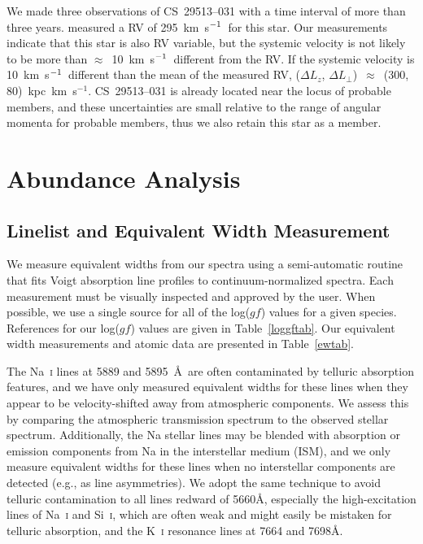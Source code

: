 \documentclass{emulateapj}
\def\kmsec{\mbox{km~s$^{\rm -1}$}}
\begin{document}
We made three observations of \mbox{CS~29513--031} 
with a time interval of more than three years.
\citet{beers92} measured a RV of 295~\kmsec\ for this star.
Our measurements indicate that this star is also RV variable, but 
the systemic velocity is not likely to be more than 
$\approx$~10~\kmsec\
different from the \citet{beers92} RV.
If the systemic velocity is 10~\kmsec\ different than the mean
of the measured RV, 
($\Delta L_{z}$, $\Delta L_{\perp}$)~$\approx$~(300, 80)~kpc~km~s$^{-1}$.
\mbox{CS~29513--031} is already located near the locus of 
probable members, and these uncertainties are small relative to the
range of angular momenta for probable members, thus
we also retain this star as a member.


\section{Abundance Analysis}
\label{abund}


\subsection{Linelist and Equivalent Width Measurement}


We measure equivalent widths from our spectra using a 
semi-automatic routine that fits Voigt absorption line profiles
to continuum-normalized spectra.
Each measurement must be visually inspected and approved by the user.
When possible, we use a single source for all of the log($gf$) values
for a given species.  
References for our log($gf$) values are given in Table~\ref{loggftab}.
Our equivalent width measurements and atomic data are presented
in Table~\ref{ewtab}.

The Na~\textsc{i} lines at 5889 and 5895~\AA\ are often contaminated by
telluric absorption features, and we have only measured equivalent
widths for these lines when they appear to be velocity-shifted
away from atmospheric components.
We assess this by comparing the atmospheric transmission spectrum 
to the observed stellar spectrum.
Additionally, the Na stellar lines may be blended with absorption or
emission components from Na in the interstellar medium (ISM), and we only 
measure equivalent widths for these lines when no interstellar components
are detected (e.g., as line asymmetries).
We adopt the same technique to avoid telluric contamination to all lines
redward of 5660\AA, especially the high-excitation lines of 
Na~\textsc{i} and Si~\textsc{i}, which are often weak and might easily
be mistaken for telluric absorption, 
and the K~\textsc{i} resonance lines at 7664 and 7698\AA.
\end{document}
